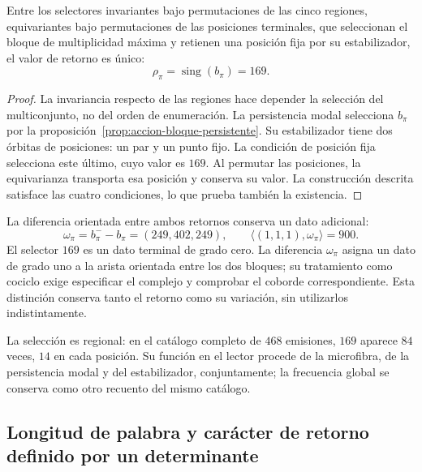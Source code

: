 \begin{theorem}
\label{thm:accion-selector-169}
Entre los selectores invariantes bajo permutaciones de las cinco regiones,
equivariantes bajo permutaciones de las posiciones terminales, que
seleccionan el bloque de multiplicidad máxima y retienen una posición
fija por su estabilizador, el valor de retorno es único:
\[
 \rho_\pi=\operatorname{sing}(b_\pi)=169.
\]
\end{theorem}
\begin{proof}
La invariancia respecto de las regiones hace depender la selección del
multiconjunto, no del orden de enumeración. La persistencia modal
selecciona \(b_\pi\) por la proposición~\ref{prop:accion-bloque-persistente}.
Su estabilizador tiene dos órbitas de posiciones: un par y un punto fijo.
La condición de posición fija selecciona este último, cuyo valor es
\(169\). Al permutar las posiciones, la equivarianza transporta esa
posición y conserva su valor. La construcción descrita satisface las
cuatro condiciones, lo que prueba también la existencia.
\end{proof}

La diferencia orientada entre ambos retornos conserva un dato adicional:
\[
 \omega_\pi=b_\pi^- - b_\pi=(249,402,249),\qquad
 \langle(1,1,1),\omega_\pi\rangle=900.
\]
El selector \(169\) es un dato terminal de grado cero. La diferencia
\(\omega_\pi\) asigna un dato de grado uno a la arista orientada entre
los dos bloques; su tratamiento como cociclo exige especificar el complejo
y comprobar el coborde correspondiente. Esta distinción conserva tanto
el retorno como su variación, sin utilizarlos indistintamente.

La selección es regional: en el catálogo completo de \(468\) emisiones,
\(169\) aparece \(84\) veces, \(14\) en cada posición. Su función en
el lector procede de la microfibra, de la persistencia modal y del
estabilizador, conjuntamente; la frecuencia global se conserva como otro
recuento del mismo catálogo.

\subsection{Longitud de palabra y carácter de retorno definido por un determinante}
\label{sec:accion-grado-determinante}

